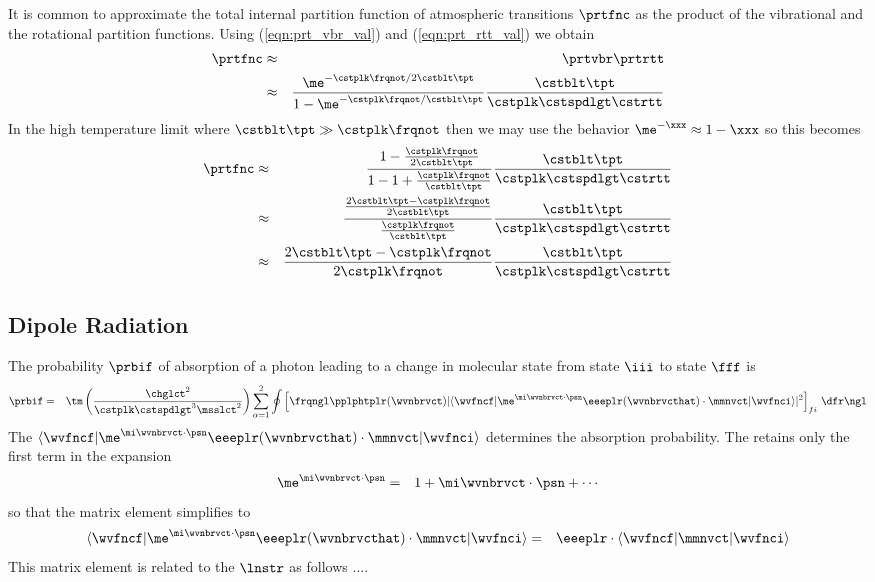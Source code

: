 \documentclass[12pt]{article}
\begin{document}
It is common to approximate the total internal partition function of 
atmospheric transitions $\prtfnc$ as the product of the vibrational and 
the rotational partition functions.
Using (\ref{eqn:prt_vbr_val}) and (\ref{eqn:prt_rtt_val}) we
obtain 
\begin{eqnarray}
\prtfnc & \approx & 
\prtvbr \prtrtt \nonumber \\
& \approx & 
\frac{\me^{-\cstplk \frqnot/2\cstblt \tpt}}
{1-\me^{-\cstplk \frqnot / \cstblt \tpt}}
\frac{\cstblt \tpt}{\cstplk \cstspdlgt \cstrtt} \nonumber
\end{eqnarray}
In the high temperature limit where $\cstblt \tpt \gg \cstplk \frqnot$
then we may use the behavior $\me^{-\xxx} \approx 1 - \xxx$ so this
becomes 
\begin{eqnarray}
\prtfnc & \approx & 
\frac{1 - \frac{\cstplk \frqnot}{2\cstblt \tpt}}
{1 - 1 + \frac{\cstplk \frqnot}{\cstblt \tpt} }
\frac{\cstblt \tpt}{\cstplk \cstspdlgt \cstrtt} \nonumber \\
& \approx & 
\frac{\frac{2\cstblt \tpt - \cstplk \frqnot}{2\cstblt \tpt}}
{\frac{\cstplk \frqnot}{\cstblt \tpt} } 
\frac{\cstblt \tpt}{\cstplk \cstspdlgt \cstrtt} \nonumber \\
& \approx & 
\frac{2\cstblt \tpt - \cstplk \frqnot}{2 \cstplk \frqnot}
\frac{\cstblt \tpt}{\cstplk \cstspdlgt \cstrtt} \nonumber
\label{eqn:prt_fnc_dfn}
\end{eqnarray}

\subsection[Dipole Radiation]{Dipole Radiation}\label{sxn:dpl}
The probability $\prbif$ of absorption of a photon leading to a
change in molecular state from state $\iii$ to state $\fff$ is
\begin{eqnarray}
\prbif & = & \tm 
\left( \frac{\chglct^{2}}{\cstplk \cstspdlgt^{3} \msslct^{2}} \right)
\sum_{\alpha = 1}^{2} \oint
\left[ \frqngl \pplphtplr(\wvnbrvct) 
|\langle \wvfncf | \me^{\mi \wvnbrvct \cdot \psn} \eeeplr(\wvnbrvcthat)
\cdot \mmnvct | \wvfnci \rangle |^{2} \right]_{fi} \,\dfr\ngl
\label{eqn:abs_prb}
\end{eqnarray}
The  
$\langle \wvfncf | \me^{\mi \wvnbrvct \cdot \psn}
\eeeplr(\wvnbrvcthat) \cdot \mmnvct | \wvfnci \rangle$
determines the absorption probability.
The  retains only the first term in the
expansion
\begin{eqnarray}
\me^{\mi \wvnbrvct \cdot \psn} & = & 1 + \mi \wvnbrvct \cdot \psn +
\cdots \nonumber
\label{eqn:dpl_apx}
\end{eqnarray}
so that the matrix element simplifies to
\begin{eqnarray}
\langle \wvfncf | \me^{\mi \wvnbrvct \cdot \psn}
\eeeplr(\wvnbrvcthat) \cdot \mmnvct | \wvfnci \rangle
& = & \eeeplr \cdot \langle \wvfncf | \mmnvct | \wvfnci \rangle
\label{eqn:mtx_lmn}
\end{eqnarray}
This matrix element is related to the  $\lnstr$
as follows \cite[][p.~709]{RRG98}.... %
\end{document}
